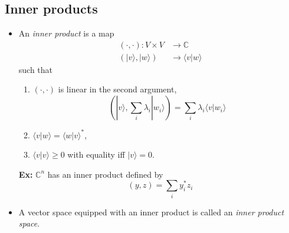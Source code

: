 \documentclass[12 pt]{article}
\newcommand{\C}{\mathbb{C}}
\begin{document}
\subsection{Inner products}
\begin{itemize}
	\item An \emph{inner product} is a map 
		\begin{align*}
		(\cdot,\cdot):V \times V &\to \C \\
		(|v\rangle, |w\rangle) &\to \langle v|w\rangle	
		\end{align*}
		such that
		\begin{enumerate}[(1)]
			\item $(\cdot,\cdot)$ is linear in the second argument,
			$$(|v\rangle,\sum_i\lambda_i|w_i\rangle)=\sum_i\lambda_i\langle v|w_i\rangle$$
			\item $\langle v|w\rangle=\langle w|v\rangle^*$,
			\item $\langle v|v\rangle \geq 0$ with equality iff $|v\rangle =0$.
		\end{enumerate}
		{\bf Ex:} $\C^n$ has an inner product defined by
		$$(y,z)=\sum_i y_i^*z_i$$
		\item A vector space equipped with an inner product is called an \emph{inner product space}.
\end{itemize}
\end{document}
